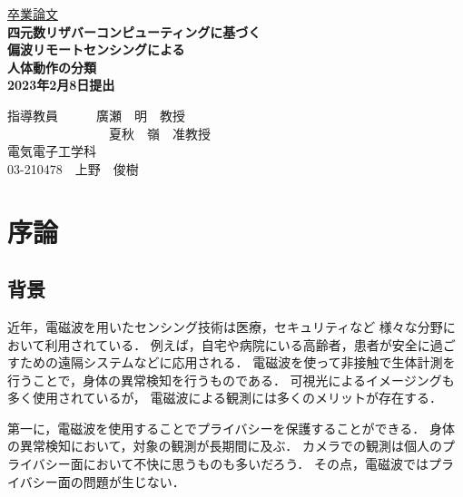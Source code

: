 \documentclass[uplatex,a4paper,12pt]{jsarticle}
\begin{document}
\begin{center}
\vspace*{3cm} \underline{\HUGE 卒業論文 }\\
\vspace{1cm}
\fontsize{24truept}{25truept}\selectfont
\bf{四元数リザバーコンピューティングに基づく\\ \vspace{5mm}
偏波リモートセンシングによる\\ \vspace{5mm}
人体動作の分類\\}
\vspace{3cm}
\huge 2023年2月8日提出 \\
\vspace{3cm}
\end{center}
\begin{minipage}{0.4\hsize}
\hspace{1zw}
\end{minipage}
\begin{center}
\begin{minipage}{0.7\hsize}
{\huge 指導教員　　　廣瀬　明　教授\\　　　　　　　\ \ 夏秋　嶺　准教授}
\vspace{1cm}\\
\centering
{\huge 電気電子工学科\\}
{\huge 03-210478　上野　俊樹}
\end{minipage}
\end{center}


\newpage
\tableofcontents

\newpage 

\section{序論}
\subsection{背景}
近年，電磁波を用いたセンシング技術は医療，セキュリティなど
様々な分野において利用されている\cite{human_motion}．
例えば，自宅や病院にいる高齢者，患者が安全に過ごすための遠隔システムなどに応用される．
電磁波を使って非接触で生体計測を行うことで，身体の異常検知を行うものである．
可視光によるイメージングも多く使用されているが，
電磁波による観測には多くのメリットが存在する．

第一に，電磁波を使用することでプライバシーを保護することができる．
身体の異常検知において，対象の観測が長期間に及ぶ．
カメラでの観測は個人のプライバシー面において不快に思うものも多いだろう．
その点，電磁波ではプライバシー面の問題が生じない．
\end{document}
